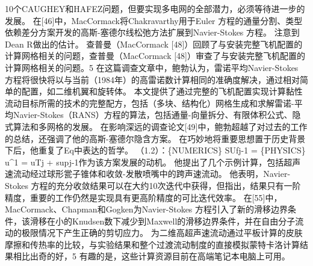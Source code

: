 \documentclass[UTF8,11pt,a4paper,openany,fontset=fandol]{ctexbook}
\begin{document}
10个CAUGHEY和HAFEZ问题，但要实现多电网的全部潜力，必须等待进一步的发展。 在[46]中，MacCormack将Chakravarthy用于Euler 方程的通量分割、类型依赖差分方案开发的高斯-塞德尔线松弛方法扩展到Navier-Stokes 方程。 注意到Dean R做出的估计。 查普曼（MacCormack [48]）回顾了与安装完整飞机配置的计算网格相关的问题，查普曼（MacCormack [48]）审查了与安装完整飞机配置的计算网格相关的问题。5 在这篇调查文章中，鲍勃认为，雷诺平均Navier-Stokes 方程将很快将以与当前（1984年）的高雷诺数计算相同的准确度解决，通过相对简单的配置，如二维机翼和旋转体。 本文提供了通过完整的飞机配置实现计算黏性流动目标所需的技术的完整配方，包括（多块、结构化）网格生成和求解雷诺-平均Navier-Stokes（RANS）方程的算法，包括通量-向量拆分、有限体积公式、隐式算法和多网格的发展。 在影响深远的调查论文[49]中，鲍勃超越了对过去的工作的总结，还强调了他的高斯-塞德尔隐含方案。 在巧妙地将重要思想置于历史背景下后，他重复了Eq中表达的哲学。 （1.2）：\{NUMERICS\} SUfj-1 = \{PHYSICS\} u\textasciicircum{}1 = uTj + supj-1作为该方案发展的动机。 他提出了几个示例计算，包括超声速流动经过球形瓽子锥体和收敛-发散喷嘴中的跨声速流动。 他表明，Navier-Stokes 方程的充分收敛结果可以在大约10次迭代中获得，但指出，结果只有一阶精度，重要的工作仍然是实现具有更高阶精度的可比迭代效率。 在[55]中，MacCormack、Chapman和Gogken为Navier-Stokes 方程引入了新的滑移边界条件，该滑移在小的Knudsen数下减少到Maxwell的滑移边界条件，并在自由分子流动的极限情况下产生正确的剪切应力。 为二维高超声速流动通过平板计算的皮肤摩擦和传热率的比较，与实验结果和整个过渡流动制度的直接模拟蒙特卡洛计算结果相比出奇的好，5 有趣的是，这些计算资源目前在高端笔记本电脑上可用。
\end{document}
